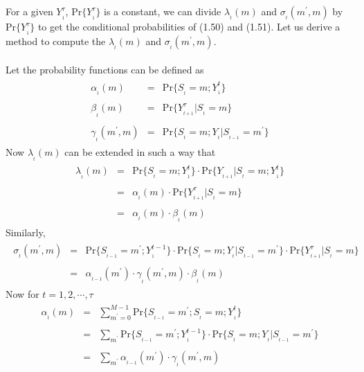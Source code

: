 For a given $Y_{_{1}}^{\tau}$, $\mathrm{Pr}\{Y_{_{1}}^{\tau}\}$ is a constant, we can divide $\lambda_{_{t}}(m)$ and $\sigma_{_{t}}(m^{'},m)$ by $\mathrm{Pr}\{Y_{_{1}}^{\tau}\}$ to get the conditional probabilities of (1.50) and (1.51). Let us derive a method to compute the $\lambda_{_{t}}(m)$ and $\sigma_{_{t}}(m^{'},m)$. \\ \\
Let the probability functions can be defined as 
\begin{eqnarray}
\begin{array}{lll}
\alpha_{_{t}}(m)&=&\mathrm{Pr}\{S_{_{t}}=m;Y_{_{1}}^{t}\} \\ \\
\beta_{_{t}}(m)&=&\mathrm{Pr}\{Y_{_{t+1}}^{\tau}\vert S_{_{t}}=m\} \\ \\
\gamma_{_{t}}(m^{'},m)&=&\mathrm{Pr}\{S_{_{t}}=m; Y_{_{t}}\vert S_{_{t-1}}=m^{'}\}
\end{array}
\end{eqnarray}
Now $\lambda_{_{t}}(m)$ can be extended in such a way that
\begin{eqnarray}
\begin{array}{lll}
\lambda_{_{t}}(m)&=&\mathrm{Pr}\{S_{_{t}}=m;Y_{_{1}}^{t}\}\cdot \mathrm{Pr}\{Y_{_{t+1}}\vert S_{_{t}}=m; Y_{_{1}}^{t}\} \\ \\
&=&\alpha_{_{t}}(m)\cdot \mathrm{Pr}\{Y_{_{t+1}}^{\tau}\vert S_{_{t}}=m\} \\ \\
&=&\alpha_{_{t}}(m)\cdot \beta_{_{t}}(m)
\end{array}
\end{eqnarray}
Similarly,
\begin{eqnarray}
\begin{array}{lll}
\sigma_{_{t}}(m^{'},m)&=&\mathrm{Pr}\{S_{_{t-1}}=m^{'};Y_{_{1}}^{t-1}\}\cdot \mathrm{Pr}\{S_{_{t}}=m;Y_{_{t}}\vert S_{_{t-1}}=m^{'}\}\cdot \mathrm{Pr}\{Y_{_{t+1}}^{\tau}\vert S_{_{t}}=m\} \\ \\
&=&\alpha_{_{t-1}}(m^{'})\cdot \gamma_{_{t}}(m^{'},m)\cdot \beta_{_{t}}(m)
\end{array}
\end{eqnarray}
Now for $t=1,2,\cdots,\tau$
\begin{eqnarray}
\begin{array}{lll}
\alpha_{_{t}}(m)&=&\sum\limits_{m^{'}=0}^{M-1}\mathrm{Pr}\{S_{_{t-1}}=m^{'};S_{_{t}}=m;Y_{_{1}}^t\} \\ \\
&=&\sum\limits_{m^{'}}^{}\mathrm{Pr}\{S_{_{t-1}}=m^{'};Y_{_{1}}^{t-1}\}\cdot \mathrm{Pr}\{S_{_{t}}=m;Y_{_{t}}\vert S_{_{t-1}}=m^{'}\} \\ \\
&=&\sum\limits_{m^{'}}^{}\alpha_{_{t-1}}(m^{'})\cdot \gamma_{_{t}}(m^{'},m)
\end{array}
\end{eqnarray}
